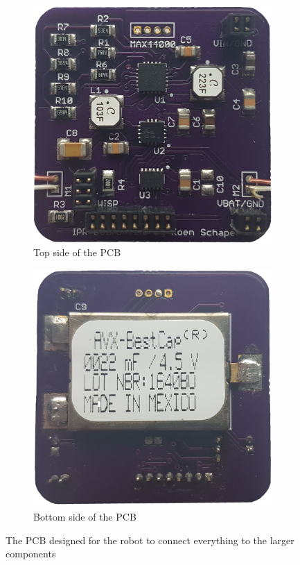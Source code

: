 \begin{figure}
	\centering
	\begin{subfigure}[b]{0.45\textwidth}
		\includegraphics[width=\textwidth]{pics/pcb_front.jpg}
		\caption{Top side of the PCB}
		\label{fig:pcb_robot_front}
	\end{subfigure}
	\qquad
	\begin{subfigure}[b]{0.45\textwidth}
		\includegraphics[width=\textwidth]{pics/pcb_back.jpg}
		\caption{Bottom side of the PCB}
		\label{fig:pcb_robot_back}
	\end{subfigure}
	\caption{The PCB designed for the robot to connect everything to the larger components}
	\label{fig:pcb_robot}
\end{figure}


